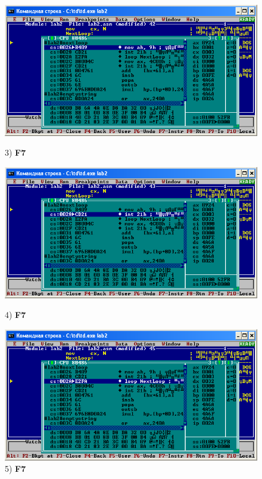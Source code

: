 \begin{figure}[!htp]
    \centering
    \begin{minipage}{0.32\textwidth}
        \centering
        \includegraphics[width=.99\linewidth]
            {../_INCLUDES/task-4-9/3.png}
        \caption{3) \textbf{F7}}
        \label{fig:task_4_9}
    \end{minipage}
    \begin {minipage}{0.32\textwidth}
        \centering
        \includegraphics[width=.99\linewidth]
            {../_INCLUDES/task-4-9/4.png}
        \caption{4) \textbf{F7}}
        \label{fig:task_4_9}
    \end{minipage}
    \begin {minipage}{0.32\textwidth}
        \centering
        \includegraphics[width=.99\linewidth]
            {../_INCLUDES/task-4-9/5.png}
        \caption{5) \textbf{F7}}
        \label{fig:task_4_9}
    \end{minipage}
\end{figure}

